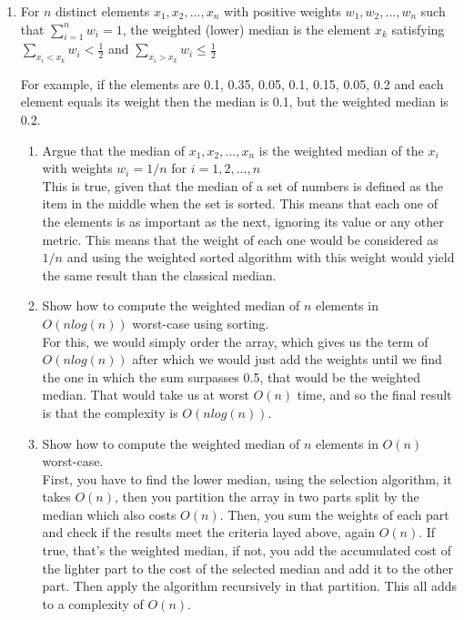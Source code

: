 \documentclass{article}
\begin{document}
\begin{enumerate}
    \item For $n$ distinct elements $x_1, x_2, ..., x_n$ with positive weights $w_1, w_2, ..., w_n$ such that $\sum^{n}_{i=1} w_i= 1$, the weighted (lower) median is the element $x_k$ satisfying $\sum_{x_i<x_k}w_i < \frac{1}{2}$ and $\sum_{x_i>x_k}w_i \leq \frac{1}{2}$

    For example, if the elements are 0.1, 0.35, 0.05, 0.1, 0.15, 0.05, 0.2 and each element equals its weight then the median is 0.1, but the weighted median is 0.2.
    \begin{enumerate}
        \item Argue that the median of $x_1, x_2, ..., x_n$ is the weighted median of the $x_i$ with weights $w_i= 1/n$ for $i=1,2, ..., n$\\
        This is true, given that the median of a set of numbers is defined as the item in the middle when the set is sorted. This means that each one of the elements is as important as the next, ignoring its value or any other metric. This means that the weight of each one would be considered as $1/n$ and using the weighted sorted algorithm with this weight would yield the same result than the classical median.
        \item Show how to compute the weighted median of $n$ elements in $O(nlog(n))$ worst-case using sorting.\\
        For this, we would simply order the array, which gives us the term of $O(nlog(n))$ after which we would just add the weights until we find the one in which the sum surpasses 0.5, that would be the weighted median. That would take us at worst $O(n)$ time, and so the final result is that the complexity is $O(nlog(n))$.
        \item Show how to compute the weighted median of $n$ elements in $O(n)$ worst-case.\\
        First, you have to find the lower median, using the selection algorithm, it takes $O(n)$, then you partition the array in two parts split by the median which also costs $O(n)$. Then, you sum the weights of each part and check if the results meet the criteria layed above, again $O(n)$. If true, that's the weighted median, if not, you add the accumulated cost of the lighter part to the cost of the selected median and add it to the other part. Then apply the algorithm recursively in that partition. This all adds to a complexity of $O(n)$.
    \end{enumerate}


\end{enumerate}
\end{document}

